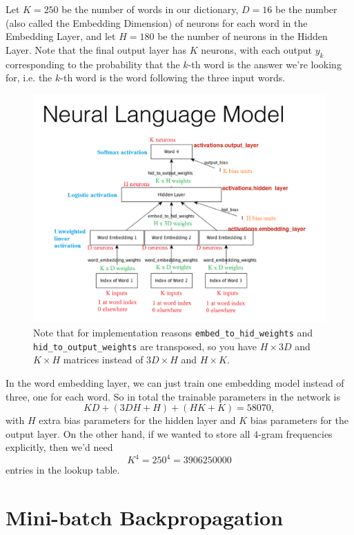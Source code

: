 \documentclass[12pt]{article}
\theoremstyle{plain}
\theoremstyle{definition}
\theoremstyle{remark}
\begin{document}
Let $K = 250$ be the number of words in our dictionary, $D = 16$ be the number (also called the Embedding Dimension) of neurons for each word in the Embedding Layer, and let $H = 180$ be the number of neurons in the Hidden Layer. Note that the final output layer has $K$ neurons, with each output $y_k$ corresponding to the probability that the $k$-th word is the answer we're looking for, i.e. the $k$-th word is the word following the three input words.

\begin{figure}[H]
\centering
\includegraphics[width=1.0\textwidth]{neuralnetlanguagemodel}
\caption{Note that for implementation reasons \lstinline|embed_to_hid_weights| and \lstinline|hid_to_output_weights| are transposed, so you have $H \times 3D$ and $K \times H$ matrices instead of $3D \times H$ and $H \times K$.}
\end{figure}

In the word embedding layer, we can just train one embedding model instead of three, one for each word. So in total the trainable parameters in the network is $$KD + (3DH + H) + (HK + K) = 58070,$$ with $H$ extra bias parameters for the hidden layer and $K$ bias parameters for the output layer. On the other hand, if we wanted to store all $4$-gram frequencies explicitly, then we'd need $$K^4 = 250^4 = 3906250000$$ entries in the lookup table.

\section{Mini-batch Backpropagation}
\end{document}
